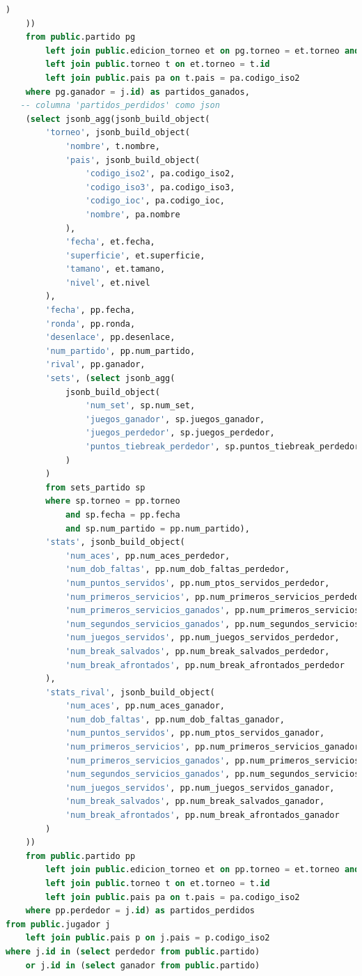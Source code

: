 \documentclass[10pt]{opticajnl}
\begin{document}
\begin{lstlisting}[language=SQL]
		)
	)) 
	from public.partido pg 
		left join public.edicion_torneo et on pg.torneo = et.torneo and pg.fecha = et.fecha 
		left join public.torneo t on et.torneo = t.id 
		left join public.pais pa on t.pais = pa.codigo_iso2
	where pg.ganador = j.id) as partidos_ganados,
   -- columna 'partidos_perdidos' como json
	(select jsonb_agg(jsonb_build_object(
		'torneo', jsonb_build_object(
			'nombre', t.nombre, 
			'pais', jsonb_build_object(
				'codigo_iso2', pa.codigo_iso2,
				'codigo_iso3', pa.codigo_iso3,
				'codigo_ioc', pa.codigo_ioc,
				'nombre', pa.nombre
			),
			'fecha', et.fecha,
			'superficie', et.superficie,
			'tamano', et.tamano,
			'nivel', et.nivel
		),
		'fecha', pp.fecha,
		'ronda', pp.ronda,
		'desenlace', pp.desenlace,
		'num_partido', pp.num_partido,
		'rival', pp.ganador,
		'sets', (select jsonb_agg(
			jsonb_build_object(
				'num_set', sp.num_set,
				'juegos_ganador', sp.juegos_ganador,
				'juegos_perdedor', sp.juegos_perdedor,
				'puntos_tiebreak_perdedor', sp.puntos_tiebreak_perdedor
			)
		) 
		from sets_partido sp 
		where sp.torneo = pp.torneo 
			and sp.fecha = pp.fecha 
			and sp.num_partido = pp.num_partido),
		'stats', jsonb_build_object(
			'num_aces', pp.num_aces_perdedor,
			'num_dob_faltas', pp.num_dob_faltas_perdedor,
			'num_puntos_servidos', pp.num_ptos_servidos_perdedor,
			'num_primeros_servicios', pp.num_primeros_servicios_perdedor,
			'num_primeros_servicios_ganados', pp.num_primeros_servicios_ganados_perdedor,
			'num_segundos_servicios_ganados', pp.num_segundos_servicios_ganados_perdedor,
			'num_juegos_servidos', pp.num_juegos_servidos_perdedor,
			'num_break_salvados', pp.num_break_salvados_perdedor,
			'num_break_afrontados', pp.num_break_afrontados_perdedor
		),
		'stats_rival', jsonb_build_object(
			'num_aces', pp.num_aces_ganador,
			'num_dob_faltas', pp.num_dob_faltas_ganador,
			'num_puntos_servidos', pp.num_ptos_servidos_ganador,
			'num_primeros_servicios', pp.num_primeros_servicios_ganador,
			'num_primeros_servicios_ganados', pp.num_primeros_servicios_ganados_ganador,
			'num_segundos_servicios_ganados', pp.num_segundos_servicios_ganados_ganador,
			'num_juegos_servidos', pp.num_juegos_servidos_ganador,
			'num_break_salvados', pp.num_break_salvados_ganador,
			'num_break_afrontados', pp.num_break_afrontados_ganador
		)
	)) 
	from public.partido pp
		left join public.edicion_torneo et on pp.torneo = et.torneo and pp.fecha = et.fecha
		left join public.torneo t on et.torneo = t.id
		left join public.pais pa on t.pais = pa.codigo_iso2
	where pp.perdedor = j.id) as partidos_perdidos
from public.jugador j
	left join public.pais p on j.pais = p.codigo_iso2
where j.id in (select perdedor from public.partido)
	or j.id in (select ganador from public.partido)
\end{lstlisting}
\end{document}
